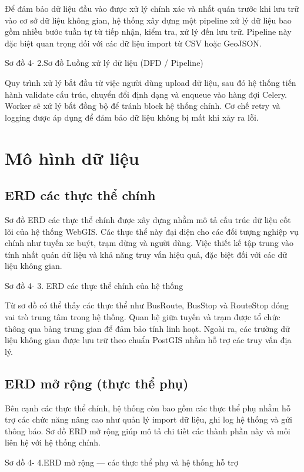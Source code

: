 \documentclass[13pt,a4paper]{report}
\begin{document}
Để đảm bảo dữ liệu đầu vào được xử lý chính xác và nhất quán trước khi lưu trữ vào cơ sở dữ liệu không gian, hệ thống xây dựng một pipeline xử lý dữ liệu bao gồm nhiều bước tuần tự từ tiếp nhận, kiểm tra, xử lý đến lưu trữ. Pipeline này đặc biệt quan trọng đối với các dữ liệu import từ CSV hoặc GeoJSON.

Sơ đồ 4- 2.Sơ đồ Luồng xử lý dữ liệu (DFD / Pipeline)

Quy trình xử lý bắt đầu từ việc người dùng upload dữ liệu, sau đó hệ thống tiến hành validate cấu trúc, chuyển đổi định dạng và enqueue vào hàng đợi Celery. Worker sẽ xử lý bất đồng bộ để tránh block hệ thống chính. Cơ chế retry và logging được áp dụng để đảm bảo dữ liệu không bị mất khi xảy ra lỗi.

\section{Mô hình dữ liệu}

\subsection{ERD các thực thể chính}

Sơ đồ ERD các thực thể chính được xây dựng nhằm mô tả cấu trúc dữ liệu cốt lõi của hệ thống WebGIS. Các thực thể này đại diện cho các đối tượng nghiệp vụ chính như tuyến xe buýt, trạm dừng và người dùng. Việc thiết kế tập trung vào tính nhất quán dữ liệu và khả năng truy vấn hiệu quả, đặc biệt đối với các dữ liệu không gian.

Sơ đồ 4- 3. ERD các thực thể chính của hệ thống

Từ sơ đồ có thể thấy các thực thể như BusRoute, BusStop và RouteStop đóng vai trò trung tâm trong hệ thống. Quan hệ giữa tuyến và trạm được tổ chức thông qua bảng trung gian để đảm bảo tính linh hoạt. Ngoài ra, các trường dữ liệu không gian được lưu trữ theo chuẩn PostGIS nhằm hỗ trợ các truy vấn địa lý.

\subsection{ERD mở rộng (thực thể phụ)}

Bên cạnh các thực thể chính, hệ thống còn bao gồm các thực thể phụ nhằm hỗ trợ các chức năng nâng cao như quản lý import dữ liệu, ghi log hệ thống và gửi thông báo. Sơ đồ ERD mở rộng giúp mô tả chi tiết các thành phần này và mối liên hệ với hệ thống chính.

Sơ đồ 4- 4.ERD mở rộng — các thực thể phụ và hệ thống hỗ trợ
\end{document}

